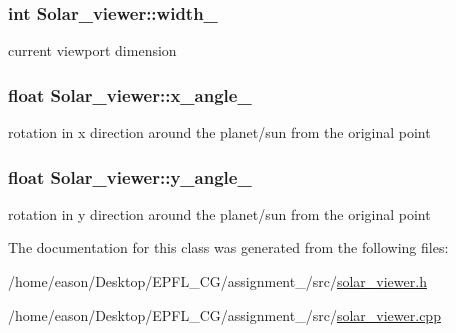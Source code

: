 \subsubsection[{\texorpdfstring{width\+\_\+}{width_}}]{\setlength{\rightskip}{0pt plus 5cm}int Solar\+\_\+viewer\+::width\+\_\+\hspace{0.3cm}{\ttfamily [private]}}\hypertarget{classSolar__viewer_ad12592d718e123912365df3ef23a2dbb}{}\label{classSolar__viewer_ad12592d718e123912365df3ef23a2dbb}


current viewport dimension 

\subsubsection[{\texorpdfstring{x\+\_\+angle\+\_\+}{x_angle_}}]{\setlength{\rightskip}{0pt plus 5cm}float Solar\+\_\+viewer\+::x\+\_\+angle\+\_\+\hspace{0.3cm}{\ttfamily [private]}}\hypertarget{classSolar__viewer_afe0f50221ea1464e4b1a9c79071bcac0}{}\label{classSolar__viewer_afe0f50221ea1464e4b1a9c79071bcac0}


rotation in x direction around the planet/sun from the original point 

\subsubsection[{\texorpdfstring{y\+\_\+angle\+\_\+}{y_angle_}}]{\setlength{\rightskip}{0pt plus 5cm}float Solar\+\_\+viewer\+::y\+\_\+angle\+\_\+\hspace{0.3cm}{\ttfamily [private]}}\hypertarget{classSolar__viewer_aec80e0da0a52b108b1b7223d2a974860}{}\label{classSolar__viewer_aec80e0da0a52b108b1b7223d2a974860}


rotation in y direction around the planet/sun from the original point 



The documentation for this class was generated from the following files\+:\begin{DoxyCompactItemize}
\item 
/home/eason/\+Desktop/\+E\+P\+F\+L\+\_\+\+C\+G/assignment\+\_/src/\hyperlink{solar__viewer_8h}{solar\+\_\+viewer.\+h}\item 
/home/eason/\+Desktop/\+E\+P\+F\+L\+\_\+\+C\+G/assignment\+\_/src/\hyperlink{solar__viewer_8cpp}{solar\+\_\+viewer.\+cpp}\end{DoxyCompactItemize}
